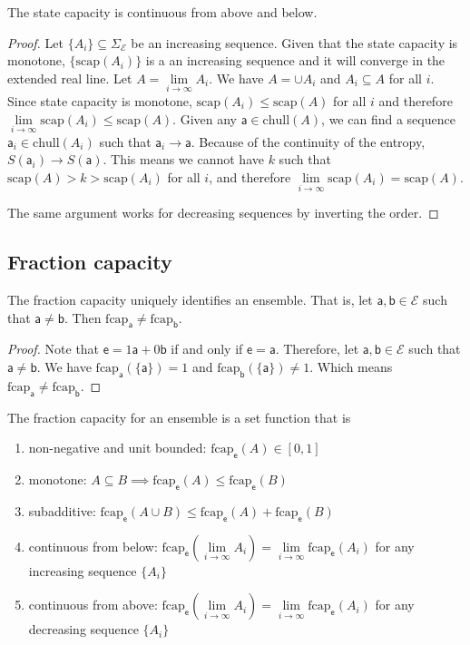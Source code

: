 \documentclass[10pt,twocolumn, nofootinbib]{revtex4-2}
\newcommand\capacity{\mathrm{scap}}
\newcommand\fcap{\mathrm{fcap}}
\newcommand\chull{\mathrm{chull}}
\newcommand{\ens}[1][e] {\mathsf{#1}} %
\newcommand{\Ens}[1][E] {\mathcal{#1}} %
\begin{document}
\begin{prop}
	The state capacity is continuous from above and below.
\end{prop}

\begin{proof}
	Let $\{A_i\} \subseteq \Sigma_{\Ens}$ be an increasing sequence. Given that the state capacity is monotone, $\{\capacity(A_i)\}$ is a an increasing sequence and it will converge in the extended real line. Let $A = \lim\limits_{i \to \infty} A_i$. We have $A = \cup A_i$ and $A_i \subseteq A$ for all $i$. Since state capacity is monotone, $\capacity(A_i) \leq \capacity(A)$ for all $i$ and therefore $\lim\limits_{i \to \infty} \capacity(A_i) \leq \capacity(A)$. Given any $\ens[a] \in \chull(A)$, we can find a sequence $\ens[a]_i \in \chull(A_i)$ such that $\ens[a]_i \to \ens[a]$. Because of the continuity of the entropy, $S(\ens[a]_i) \to S(\ens[a])$. This means we cannot have $k$ such that $\capacity(A) > k > \capacity(A_i)$ for all $i$, and therefore $\lim\limits_{i \to \infty} \capacity(A_i) = \capacity(A)$.
	
	The same argument works for decreasing sequences by inverting the order.
\end{proof}


\subsection{Fraction capacity}
\begin{coro}
	The fraction capacity uniquely identifies an ensemble. That is, let $\ens[a], \ens[b] \in \Ens$ such that $\ens[a] \neq \ens[b]$. Then $\fcap_{\ens[a]} \neq \fcap_{\ens[b]}$.
\end{coro}

\begin{proof}
	Note that $\ens = 1 \ens[a] + 0 \ens[b]$ if and only if $\ens = \ens[a]$. Therefore, let $\ens[a], \ens[b] \in \Ens$ such that $\ens[a] \neq \ens[b]$. We have $\fcap_{\ens[a]}(\{\ens[a]\}) = 1$ and $\fcap_{\ens[b]}(\{\ens[a]\}) \neq 1$. Which means $\fcap_{\ens[a]} \neq \fcap_{\ens[b]}$.
\end{proof}

\begin{prop}
	The fraction capacity for an ensemble is a set function that is
	\begin{enumerate}
		\item non-negative and unit bounded: $\fcap_{\ens}(A) \in [0,1]$
		\item monotone: $A \subseteq B \implies \fcap_{\ens}(A) \leq \fcap_{\ens}(B)$
		\item subadditive: $\fcap_{\ens}(A \cup B) \leq \fcap_{\ens}(A) + \fcap_{\ens}(B)$
		\item continuous from below: $\fcap_{\ens}(\lim\limits_{i \to \infty} A_i) = \lim\limits_{i \to \infty} \fcap_{\ens}(A_i)$ for any increasing sequence $\{A_i\}$
		\item continuous from above: $\fcap_{\ens}(\lim\limits_{i \to \infty} A_i) = \lim\limits_{i \to \infty} \fcap_{\ens}(A_i)$ for any decreasing sequence $\{A_i\}$
	\end{enumerate}
\end{prop}
\end{document}
